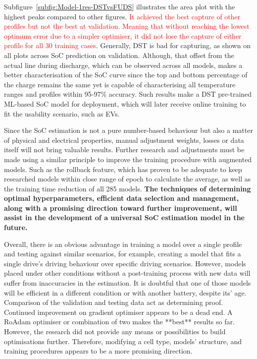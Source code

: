 Subfigure~\ref{subfig:Model-1res-DSTvsFUDS} illustrates the area plot with the highest peaks compared to other figures.
\textcolor{red}{It achieved the best capture of other profiles but not the best at validation.
Meaning that without reaching the lowest optimum error due to a simpler optimiser, it did not lose the capture of either profile for all 30 training cases.}
Generally, DST is bad for capturing, as shown on all plots across SoC prediction on validation.
Although, that offset from the actual line during discharge, which can be observed across all models, makes a better characterisation of the SoC curve since the top and bottom percentage of the charge remains the same yet is capable of characterising all temperature ranges and profiles within 95-97\% accuracy.
Such results make a DST pre-trained ML-based SoC model for deployment, which will later receive online training to fit the usability scenario, such as EVs.

%
%
Since the SoC estimation is not a pure number-based behaviour but also a matter of physical and electrical properties, manual adjustment weights, losses or data itself will not bring valuable results.
Further research and adjustments must be made using a similar principle to improve the training procedure with augmented models. 
Such as the rollback feature, which has proven to be adequate to keep researched models within close range of epoch to calculate the average, as well as the training time reduction of all 285 models.
\textbf{The techniques of determining optimal hyperparameters, efficient data selection and management, along with a promising direction toward further improvement, will assist in the development of a universal SoC estimation model in the future.}

%
%
Overall, there is an obvious advantage in training a model over a single profile and testing against similar scenarios, for example, creating a model that fits a single drive's driving behaviour over specific driving scenarios.
However, models placed under other conditions without a post-training process with new data will suffer from inaccuracies in the estimation.
It is doubtful that one of those models will be efficient in a different condition or with another battery, despite its' age.
Comparison of the validation and testing data act as determining proof.
%
Continued improvement on gradient optimiser appears to be a dead end.
A RoAdam optimiser or combination of two makes the **best** results so far.
However, the research did not provide any means or possibilities to build optimisations further.
Therefore, modifying a cell type, models' structure, and training procedures appears to be a more promising direction.
